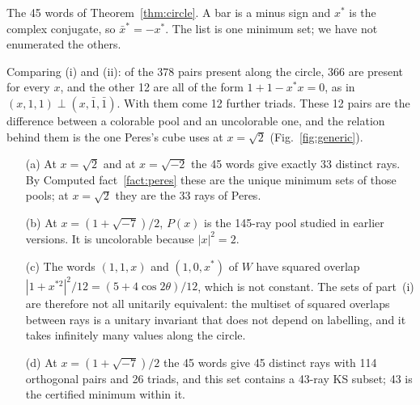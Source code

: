 \begin{table}[t]
\centering
\caption{The 45 words of Theorem~\ref{thm:circle}.  A bar is a minus sign and $x^{*}$ is the
complex conjugate, so $\bar x^{*}=-x^{*}$.  The list is one minimum set; we have not enumerated
the others.}
\label{tab:words}
\small

\end{table}

Comparing (i) and (ii): of the 378 pairs present along the circle, 366 are present for every
$x$, and the other 12 are all of the form $1+1-x^{*}x=0$, as in
$(x,1,1)\perp(x,\bar1,\bar1)$.  With them come 12 further triads.  These 12 pairs are the
difference between a colorable pool and an uncolorable one, and the relation behind them is the
one Peres's cube uses at $x=\sqrt2$ (Fig.~\ref{fig:generic}).

\begin{corollary}\label{cor:points}
\begin{enumerate}
\item[(a)] At $x=\sqrt2$ and at $x=\sqrt{-2}$ the 45 words give exactly 33 distinct rays.  By
Computed fact~\ref{fact:peres} these are the unique minimum sets of those pools; at $x=\sqrt2$
they are the 33 rays of Peres.
\item[(b)] At $x=(1+\sqrt{-7})/2$, $P(x)$ is the 145-ray pool studied in earlier versions.  It is
uncolorable because $|x|^2=2$.
\item[(c)] The words $(1,1,x)$ and $(1,0,x^{*})$ of $W$ have squared overlap
$|1+x^{*2}|^2/12=(5+4\cos2\theta)/12$, which is not constant.  The sets of part~(i) are therefore
not all unitarily equivalent: the multiset of squared overlaps between rays is a unitary
invariant that does not depend on labelling, and it takes infinitely many values along the
circle.
\item[(d)] At $x=(1+\sqrt{-7})/2$ the 45 words give 45 distinct rays with 114 orthogonal pairs
and 26 triads, and this set contains a 43-ray KS subset; 43 is the certified minimum within it.
\end{enumerate}
\end{corollary}

